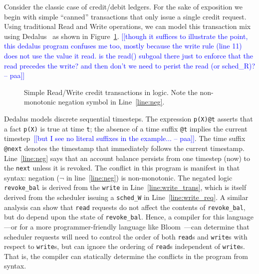 \documentclass{sig-alternate}
\newcommand{\paa}[1]{{\textcolor{blue}{[[#1 -- paa]]}}}
\begin{document}
Consider the classic case of credit/debit ledgers. For the sake of exposition we begin with simple ``canned'' transactions that only issue a single credit request.  Using
traditional Read and Write operations, we can model this transaction mix using Dedalus~\cite{dedalus} as
shown in Figure~\ref{fig:balance}.
\paa{though it suffices to illustrate the point, this dedalus program confuses me too, mostly because the write rule (line 11)
does not use the value it read.  is the read() subgoal there just to enforce that the read precedes the write?  and then don't
we need to perist the read (or sched_R)?}


\begin{figure}[h]
\begin{scriptsize}

\centering
\vspace{-10pt}
\caption{Simple Read/Write credit transactions in logic.  Note the non-monotonic negation symbol in Line~\ref{line:neg}.}
\label{fig:balance}
\end{scriptsize}
\vspace{-2pt}
\end{figure}

Dedalus models discrete sequential timesteps.
The expression \texttt{p(X)@t} asserts that a fact \texttt{p(X)} is true at time
\texttt{t}; the absence of a time suffix \texttt{@t} implies the current timestep~\paa{but I see no literal suffixes in the example...}.  The time suffix \texttt{@next} denotes the timestamp that immediately follows the
current timestamp.  Line~\ref{line:neg} says that an account balance persists from one timestep (now) to the \texttt{next} unless it is revoked. The
conflict in this program is manifest in that syntax: negation
($\neg$ in line~\ref{line:neg}) is non-monotonic.  The negated logic \texttt{revoke\_bal} is derived from the \texttt{write} in Line~\ref{line:write_trans}, which is itself derived from the scheduler issuing a \texttt{sched\_W} in Line~\ref{line:write_req}.  A similar analysis can show that \texttt{read} requests do not affect the contents of \texttt{revoke\_bal}, but do depend upon the state of \texttt{revoke\_bal}.
Hence, a compiler for this language---or for a more programmer-friendly language like Bloom~\cite{Alvaro2011}---can determine that scheduler requests will need to control the order of both \texttt{read}s and \texttt{write}s with respect to \texttt{write}s, but can ignore the ordering of \texttt{read}s independent of \texttt{write}s.  That is, the compiler can statically determine the conflicts in the program from syntax.
\end{document}
